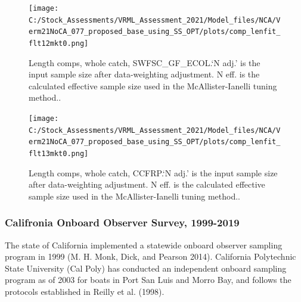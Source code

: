 \documentclass[11pt,
  english,
  a4paper,
]{article}
\begin{document}
\begin{figure}
\centering
\texttt{[image: C:/Stock\_Assessments/VRML\_Assessment\_2021/Model\_files/NCA/Verm21NoCA\_077\_proposed\_base\_using\_SS\_OPT/plots/comp\_lenfit\_flt12mkt0.png]}
\caption{Length comps, whole catch, SWFSC\_GF\_ECOL.`N adj.' is the input sample size after data-weighting adjustment. N eff. is the calculated effective sample size used in the McAllister-Ianelli tuning method..\label{fig:comp_lenfit_flt12mkt0}}
\end{figure}

\begin{figure}
\centering
\texttt{[image: C:/Stock\_Assessments/VRML\_Assessment\_2021/Model\_files/NCA/Verm21NoCA\_077\_proposed\_base\_using\_SS\_OPT/plots/comp\_lenfit\_flt13mkt0.png]}
\caption{Length comps, whole catch, CCFRP.`N adj.' is the input sample size after data-weighting adjustment. N eff. is the calculated effective sample size used in the McAllister-Ianelli tuning method..\label{fig:comp_lenfit_flt13mkt0}}
\end{figure}

\newpage


\hypertarget{califronia-onboard-observer-survey-1999-2019}{%
\subsubsection{Califronia Onboard Observer Survey, 1999-2019}\label{califronia-onboard-observer-survey-1999-2019}}

\leavevmode\tagmcend\tagstructend

The state of California implemented a statewide onboard observer sampling program in 1999 {(M. H. Monk, Dick, and Pearson 2014)\leavevmode\tagmcend\tagstructend}. California Polytechnic State University (Cal Poly) has conducted an independent onboard sampling program as of 2003 for boats in Port San Luis and Morro Bay, and follows the protocols established in Reilly et al. {(1998)\leavevmode\tagmcend\tagstructend}.
\end{document}
